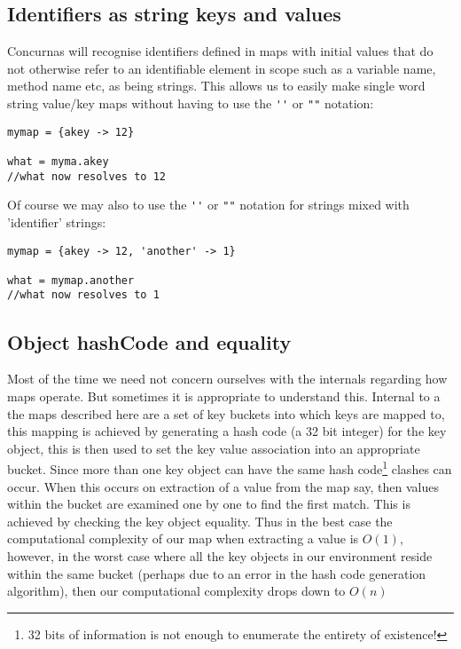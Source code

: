 \documentclass[conc-doc]{subfiles}
\begin{document}
\subsection{Identifiers as string keys and values}
Concurnas will recognise identifiers defined in maps with initial values that do not otherwise refer to an identifiable element in scope such as a variable name, method name etc, as being strings. This allows us to easily make single word string value/key maps without having to use the \lstinline{''} or \lstinline{""} notation:

\begin{lstlisting}
mymap = {akey -> 12}

what = myma.akey
//what now resolves to 12
\end{lstlisting}

Of course we may also to use the \lstinline{''} or \lstinline{""} notation for strings mixed with 'identifier' strings:

\begin{lstlisting}
mymap = {akey -> 12, 'another' -> 1}

what = mymap.another
//what now resolves to 1
\end{lstlisting}


\subsection{Object hashCode and equality}
Most of the time we need not concern ourselves with the internals regarding how maps operate. But sometimes it is appropriate to understand this. Internal to a the maps described here are a set of key buckets into which keys are mapped to, this mapping is achieved by generating a hash code (a 32 bit integer) for the key object, this is then used to set the key value association into an appropriate bucket. Since more than one key object can have the same hash code\footnote{32 bits of information is not enough to enumerate the entirety of existence!} clashes can occur. When this occurs on extraction of a value from the map say, then values within the bucket are examined one by one to find the first match. This is achieved by checking the key object equality. Thus in the best case the computational complexity of our map when extracting a value is $O(1)$, however, in the worst case where all the key objects in our environment reside within the same bucket (perhaps due to an error in the hash code generation algorithm), then our computational complexity drops down to $O(n)$
\end{document}
